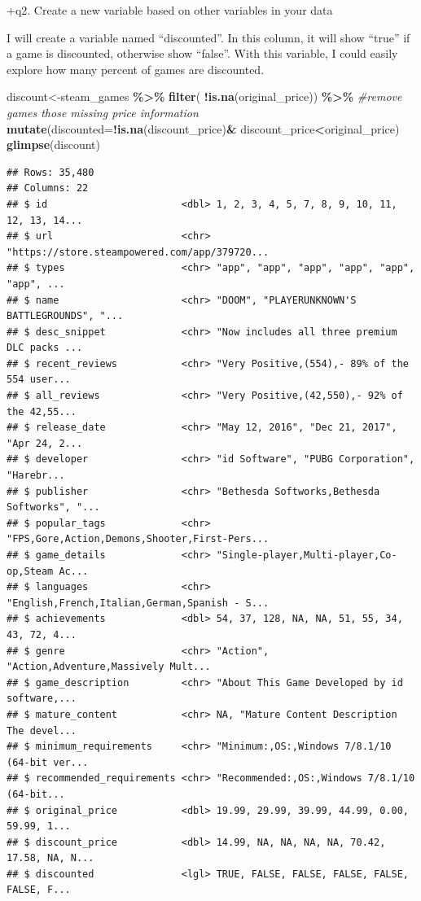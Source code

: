 \documentclass[
]{article}
\newenvironment{Shaded}{\begin{snugshade}}{\end{snugshade}}
\newcommand{\CommentTok}[1]{\textcolor[rgb]{0.56,0.35,0.01}{\textit{#1}}}
\newcommand{\DataTypeTok}[1]{\textcolor[rgb]{0.13,0.29,0.53}{#1}}
\newcommand{\KeywordTok}[1]{\textcolor[rgb]{0.13,0.29,0.53}{\textbf{#1}}}
\newcommand{\NormalTok}[1]{#1}
\newcommand{\OperatorTok}[1]{\textcolor[rgb]{0.81,0.36,0.00}{\textbf{#1}}}
\newcommand{\StringTok}[1]{\textcolor[rgb]{0.31,0.60,0.02}{#1}}
\begin{document}
+q2. Create a new variable based on other variables in your data

I will create a variable named ``discounted''. In this column, it will
show ``true'' if a game is discounted, otherwise show ``false''. With
this variable, I could easily explore how many percent of games are
discounted.

\begin{Shaded}
\begin{Highlighting}[]
\NormalTok{discount\textless{}{-}steam\_games }\OperatorTok{\%\textgreater{}\%}\StringTok{ }
\StringTok{    }\KeywordTok{filter}\NormalTok{( }\OperatorTok{!}\KeywordTok{is.na}\NormalTok{(original\_price)) }\OperatorTok{\%\textgreater{}\%}\StringTok{ }\CommentTok{\#remove games those missing price information}
\StringTok{    }\KeywordTok{mutate}\NormalTok{(}\DataTypeTok{discounted=}\OperatorTok{!}\KeywordTok{is.na}\NormalTok{(discount\_price)}\OperatorTok{\&}\StringTok{ }\NormalTok{discount\_price}\OperatorTok{\textless{}}\NormalTok{original\_price)}
\KeywordTok{glimpse}\NormalTok{(discount)}
\end{Highlighting}
\end{Shaded}

\begin{verbatim}
## Rows: 35,480
## Columns: 22
## $ id                       <dbl> 1, 2, 3, 4, 5, 7, 8, 9, 10, 11, 12, 13, 14...
## $ url                      <chr> "https://store.steampowered.com/app/379720...
## $ types                    <chr> "app", "app", "app", "app", "app", "app", ...
## $ name                     <chr> "DOOM", "PLAYERUNKNOWN'S BATTLEGROUNDS", "...
## $ desc_snippet             <chr> "Now includes all three premium DLC packs ...
## $ recent_reviews           <chr> "Very Positive,(554),- 89% of the 554 user...
## $ all_reviews              <chr> "Very Positive,(42,550),- 92% of the 42,55...
## $ release_date             <chr> "May 12, 2016", "Dec 21, 2017", "Apr 24, 2...
## $ developer                <chr> "id Software", "PUBG Corporation", "Harebr...
## $ publisher                <chr> "Bethesda Softworks,Bethesda Softworks", "...
## $ popular_tags             <chr> "FPS,Gore,Action,Demons,Shooter,First-Pers...
## $ game_details             <chr> "Single-player,Multi-player,Co-op,Steam Ac...
## $ languages                <chr> "English,French,Italian,German,Spanish - S...
## $ achievements             <dbl> 54, 37, 128, NA, NA, 51, 55, 34, 43, 72, 4...
## $ genre                    <chr> "Action", "Action,Adventure,Massively Mult...
## $ game_description         <chr> "About This Game Developed by id software,...
## $ mature_content           <chr> NA, "Mature Content Description  The devel...
## $ minimum_requirements     <chr> "Minimum:,OS:,Windows 7/8.1/10 (64-bit ver...
## $ recommended_requirements <chr> "Recommended:,OS:,Windows 7/8.1/10 (64-bit...
## $ original_price           <dbl> 19.99, 29.99, 39.99, 44.99, 0.00, 59.99, 1...
## $ discount_price           <dbl> 14.99, NA, NA, NA, NA, 70.42, 17.58, NA, N...
## $ discounted               <lgl> TRUE, FALSE, FALSE, FALSE, FALSE, FALSE, F...
\end{verbatim}
\end{document}
